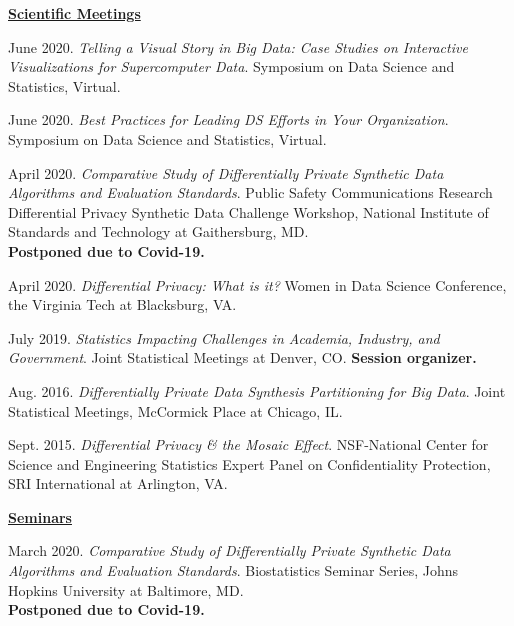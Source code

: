 \documentclass[11pt, letterpaper, roman]{moderncv} %
\begin{document}
\underline{\textbf{\large Scientific Meetings}}\normalsize
\vspace{6pt}
\begin{etaremune}[topsep=0pt, itemsep=4pt, partopsep=0pt, parsep=0pt]
    \item June 2020. \textit{Telling a Visual Story in Big Data: Case Studies on Interactive Visualizations for Supercomputer Data}. Symposium on Data Science and Statistics, Virtual.
  
    \item June 2020. \textit{Best Practices for Leading DS Efforts in Your Organization}. Symposium on Data Science and Statistics, Virtual.  
  
    \item April 2020. \textit{Comparative Study of Differentially Private Synthetic Data Algorithms and Evaluation Standards}. Public Safety Communications Research Differential Privacy Synthetic Data Challenge Workshop, National Institute of Standards and Technology at Gaithersburg, MD.\\
  \textbf{Postponed due to Covid-19.}
  
    \item April 2020. \textit{Differential Privacy: What is it?} Women in Data Science Conference, the Virginia Tech at Blacksburg, VA.

    \item July 2019. \textit{Statistics Impacting Challenges in Academia, Industry, and Government}. Joint Statistical Meetings at Denver, CO. \textbf{Session organizer.}

    \item Aug. 2016. \textit{Differentially Private Data Synthesis Partitioning for Big Data}. Joint Statistical Meetings, McCormick Place at Chicago, IL.
    
    \item Sept. 2015. \textit{Differential Privacy \& the Mosaic Effect}. NSF-National Center for Science and Engineering Statistics Expert Panel on Confidentiality Protection, SRI International at Arlington, VA.

\vspace{5pt}
\hspace{-0.30in}\underline{\textbf{\large Seminars}}\normalsize
  \item March 2020. \textit{Comparative Study of Differentially Private Synthetic Data Algorithms and Evaluation Standards}. Biostatistics Seminar Series, Johns Hopkins University at Baltimore, MD.\\
  \textbf{Postponed due to Covid-19.}
  

\end{etaremune}
\end{document}
